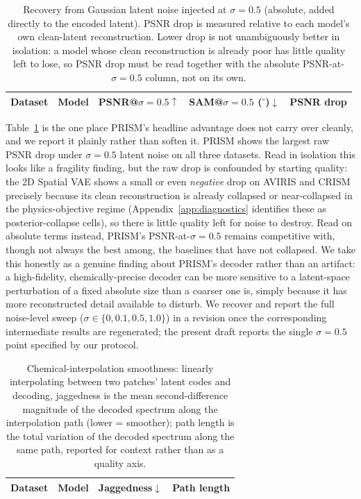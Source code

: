 \documentclass{article} %
\begin{document}
\begin{table}[t]
\centering
\small
\begin{tabular}{llccc}
\toprule
\textbf{Dataset} & \textbf{Model} & \textbf{PSNR@$\sigma{=}0.5\uparrow$} & \textbf{SAM@$\sigma{=}0.5$ ($^\circ$)$\downarrow$} & \textbf{PSNR drop} \\
\midrule

\end{tabular}
\caption{Recovery from Gaussian latent noise injected at $\sigma{=}0.5$ (absolute, added directly to the encoded latent). PSNR drop is measured relative to each model's own clean-latent reconstruction. Lower drop is not unambiguously better in isolation: a model whose clean reconstruction is already poor has little quality left to lose, so PSNR drop must be read together with the absolute PSNR-at-$\sigma{=}0.5$ column, not on its own.}
\label{tab:table2}
\end{table}

Table~\ref{tab:table2} is the one place PRISM's headline advantage does not carry over cleanly, and we report it plainly rather than soften it. PRISM shows the largest raw PSNR drop under $\sigma{=}0.5$ latent noise on all three datasets. Read in isolation this looks like a fragility finding, but the raw drop is confounded by starting quality: the 2D Spatial VAE shows a small or even \emph{negative} drop on AVIRIS and CRISM precisely because its clean reconstruction is already collapsed or near-collapsed in the physics-objective regime (Appendix~\ref{app:diagnostics} identifies these as posterior-collapse cells), so there is little quality left for noise to destroy. Read on absolute terms instead, PRISM's PSNR-at-$\sigma{=}0.5$ remains competitive with, though not always the best among, the baselines that have not collapsed. We take this honestly as a genuine finding about PRISM's decoder rather than an artifact: a high-fidelity, chemically-precise decoder can be more sensitive to a latent-space perturbation of a fixed absolute size than a coarser one is, simply because it has more reconstructed detail available to disturb. We recover and report the full noise-level sweep ($\sigma \in \{0, 0.1, 0.5, 1.0\}$) in a revision once the corresponding intermediate results are regenerated; the present draft reports the single $\sigma{=}0.5$ point specified by our protocol.

\begin{table}[t]
\centering
\small
\begin{tabular}{llcc}
\toprule
\textbf{Dataset} & \textbf{Model} & \textbf{Jaggedness$\downarrow$} & \textbf{Path length} \\
\midrule

\end{tabular}
\caption{Chemical-interpolation smoothness: linearly interpolating between two patches' latent codes and decoding, jaggedness is the mean second-difference magnitude of the decoded spectrum along the interpolation path (lower = smoother); path length is the total variation of the decoded spectrum along the same path, reported for context rather than as a quality axis.}
\label{tab:table3}
\end{table}
\end{document}
